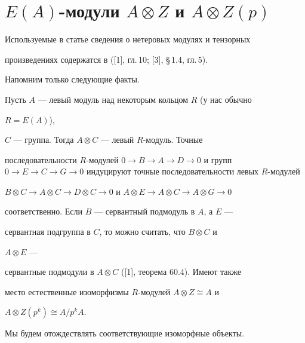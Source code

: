  


\section{$E(A)$-модули $A\otimes Z$ и $A\otimes Z(p)$} 


 


Используемые в статье сведения о нетеровых модулях и тензорных 


произведениях содержатся в ([1], гл.\,10; [3], \S\,1.4, гл.\,5). 


Напомним только следующие факты. 


 


Пусть $A$ --- левый модуль над некоторым кольцом $R$ (у нас обычно 


$R=E(A)$), 


$C$ --- группа. Тогда $A\otimes C$ --- левый $R$-модуль. Точные 


последовательности $R$-модулей $0\to B\to A\to D\to 0$ и групп $0\to E\to 


C\to G\to0$ индуцируют точные последовательности левых $R$-модулей 


$B\otimes C\to A\otimes C\to D\otimes C\to0$ и $A\otimes E\to A\otimes 


C\to A\otimes G\to0$ 


соответственно. Если $B$ --- сервантный подмодуль в $A$, а $E$ --- 


сервантная подгруппа в $C$, то можно считать, что $B\otimes C$ и 


$A\otimes E$ --- 


сервантные подмодули в $A\otimes C$ ([1], теорема 60.4). Имеют также 


место естественные изоморфизмы $R$-модулей $A\otimes Z\cong A$ и 


$A\otimes Z(p^k)\cong A/p^k A$. 


Мы будем отождествлять соответствующие изоморфные объекты. 


 


